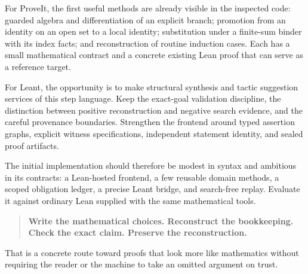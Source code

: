 \documentclass[11pt,a4paper]{article}
\theoremstyle{remark}
\begin{document}
For ProveIt, the first useful methods are already visible in the inspected code: guarded algebra and differentiation of an explicit branch; promotion from an identity on an open set to a local identity; substitution under a finite-sum binder with its index facts; and reconstruction of routine induction cases. Each has a small mathematical contract and a concrete existing Lean proof that can serve as a reference target.

For Leant, the opportunity is to make structural synthesis and tactic suggestion services of this step language. Keep the exact-goal validation discipline, the distinction between positive reconstruction and negative search evidence, and the careful provenance boundaries. Strengthen the frontend around typed assertion graphs, explicit witness specifications, independent statement identity, and sealed proof artifacts.

The initial implementation should therefore be modest in syntax and ambitious in its contracts: a Lean-hosted frontend, a few reusable domain methods, a scoped obligation ledger, a precise Leant bridge, and search-free replay. Evaluate it against ordinary Lean supplied with the same mathematical tools.

\begin{quote}
\textbf{Write the mathematical choices. Reconstruct the bookkeeping. Check the exact claim. Preserve the reconstruction.}
\end{quote}
That is a concrete route toward proofs that look more like mathematics without requiring the reader or the machine to take an omitted argument on trust.

\appendix
\clearpage
\end{document}
